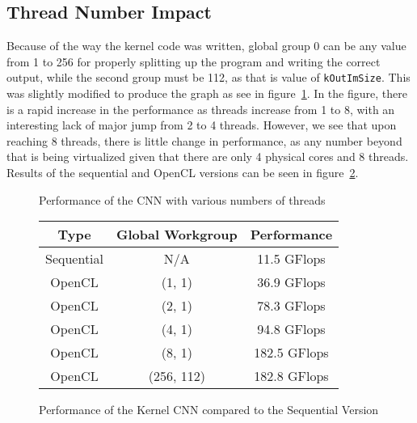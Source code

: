 \documentclass[letterpaper,twocolumn,10pt]{article}
\def\code#1{\texttt{#1}}
\begin{document}
\subsection{Thread Number Impact}
Because of the way the kernel code was written, global group 0 can be any value
from 1 to 256 for properly splitting up the program and writing the correct
output, while the second group must be 112, as that is value of
\code{kOutImSize}. This was slightly modified to produce the graph as see in
figure~\ref{fig:threads}. In the figure, there is a rapid increase in the 
performance as threads increase from 1 to 8, with an interesting lack of major
jump from 2 to 4 threads. However, we see that upon reaching 8 threads, there
is little change in performance, as any number beyond that is being virtualized
given that there are only 4 physical cores and 8 threads. Results of the
sequential and OpenCL versions can be seen in figure~\ref{table:perf}.
\begin{figure}
    \caption{\label{fig:threads} Performance of the CNN with various numbers of
    threads}
\end{figure}
\begin{figure}
  \begin{center}
    \begin{tabular}{|c|c|c|}
      \hline
      Type & Global Workgroup & Performance\\
      \hline
      Sequential & N/A & 11.5 GFlops \\
      OpenCL & (1, 1) & 36.9 GFlops \\
      OpenCL & (2, 1) & 78.3 GFlops \\
      OpenCL & (4, 1) & 94.8 GFlops \\
      OpenCL & (8, 1) & 182.5 GFlops \\
      OpenCL & (256, 112) & 182.8 GFlops \\
      \hline 
    \end{tabular}
  \end{center}
  \caption{\label{table:perf} Performance of the Kernel CNN compared to the 
  Sequential Version}
\end{figure}
\end{document}
